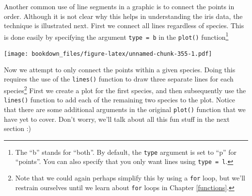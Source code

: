 \documentclass[
]{krantz}
\makeatletter
\newenvironment{Shaded}{\begin{snugshade}}{\end{snugshade}}
\newcommand{\DataTypeTok}[1]{\textcolor[rgb]{0.27,0.27,0.27}{#1}}
\newcommand{\DecValTok}[1]{\textcolor[rgb]{0.06,0.06,0.06}{#1}}
\newcommand{\FloatTok}[1]{\textcolor[rgb]{0.06,0.06,0.06}{#1}}
\newcommand{\KeywordTok}[1]{\textcolor[rgb]{0.27,0.27,0.27}{\textbf{#1}}}
\newcommand{\NormalTok}[1]{#1}
\newcommand{\OperatorTok}[1]{\textcolor[rgb]{0.43,0.43,0.43}{\textbf{#1}}}
\newcommand{\StringTok}[1]{\textcolor[rgb]{0.5,0.5,0.5}{#1}}
\newenvironment{kframe}{%
\medskip{}
\setlength{\fboxsep}{.8em}
 \def\at@end@of@kframe{}%
 \ifinner\ifhmode%
  \def\at@end@of@kframe{\end{minipage}}%
  \begin{minipage}{\columnwidth}%
 \fi\fi%
 \def\FrameCommand##1{\hskip\@totalleftmargin \hskip-\fboxsep
 \colorbox{shadecolor}{##1}\hskip-\fboxsep
     \hskip-\linewidth \hskip-\@totalleftmargin \hskip\columnwidth}%
 \MakeFramed {\advance\hsize-\width
   \@totalleftmargin\z@ \linewidth\hsize
   \@setminipage}}%
 {\par\unskip\endMakeFramed%
 \at@end@of@kframe}
\renewenvironment{Shaded}{\begin{kframe}}{\end{kframe}}
\makeatother
\begin{document}
Another common use of line segments in a graphic is to connect the points in order. Although it is not clear why this helps in understanding the iris data, the technique is illustrated next. First we connect all lines regardless of species. This is done easily by specifying the argument \texttt{type\ =\ \textquotesingle{}b\textquotesingle{}} in the \texttt{plot()} function\footnote{The ``b'' stands for ``both''. By default, the \texttt{type} argument is set to ``p'' for ``points''. You can also specify that you only want lines using \texttt{type\ =\ \textquotesingle{}l\textquotesingle{}}.}

\begin{Shaded}
\end{Shaded}

\texttt{[image: bookdown\_files/figure-latex/unnamed-chunk-355-1.pdf]}

Now we attempt to only connect the points within a given species. Doing this requires the use of the \texttt{lines()} function to draw three separate lines for each species\footnote{Note that we could again perhaps simplify this by using a \texttt{for} loop, but we'll restrain ourselves until we learn about \texttt{for} loops in Chapter \ref{functions}.} First we create a plot for the first species, and then subsequently use the \texttt{lines()} function to add each of the remaining two species to the plot. Notice that there are some additional arguments in the original \texttt{plot()} function that we have yet to cover. Don't worry, we'll talk about all this fun stuff in the next section :)
\end{document}
